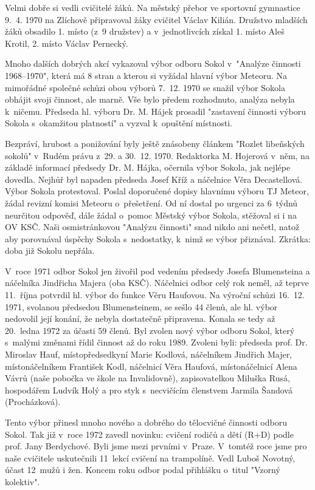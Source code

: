 \documentclass[a5paper, 11pt, twoside]{article}
\begin{document}
Velmi dobře si vedli cvičitelé žáků. Na městský přebor ve sportovní
gymnastice 9.~4. 1970 na Zlíchově připravoval žáky cvičitel Václav
Kilián. Družstvo mladších žáků obsadilo 1. místo (z~9 družstev) a
v~jednotlivcích získal 1. místo Aleš Krotil, 2. místo Václav Pernecký.

Mnoho dalších dobrých akcí vykazoval výbor odboru Sokol v~"Analýze
činnosti 1968--1970", která má 8 stran a kterou si vyžádal hlavní výbor
Meteoru. Na mimořádné společné schůzi obou výborů 7.~12. 1970 se snažil
výbor Sokola obhájit svoji činnost, ale marně. Vše bylo předem
rozhodnuto, analýza nebyla k~ničemu. Předseda hl. výboru Dr. M. Hájek
prosadil "zastavení činnosti výboru Sokola s~okamžitou platností" a
vyzval k~opuštění místnosti.

Bezpráví, hrubost a ponižování byly ještě znásobeny článkem "Rozlet
libeňských sokolů" v~Rudém právu z~29. a 30.~12. 1970. Redaktorka M.
Hojerová v~něm, na základě informací předsedy Dr. M. Hájka, očernila
výbor Sokola, jak nejlépe dovedla. Nejhůř byl napaden předseda Josef
Kříž a náčelnice Věra Decastellová. Výbor Sokola protestoval. Poslal
doporučené dopisy hlavnímu výboru TJ Meteor, žádal revizní komisi
Meteoru o~přešetření. Od ní dostal po urgenci za 6~týdnů neurčitou
odpověď, dále žádal o~pomoc Městský výbor Sokola, stěžoval si i na OV
KSČ. Naši osmistránkovou "Analýzu činnosti" snad nikdo ani nečetl,
natož aby porovnával úspěchy Sokola s~nedostatky, k~nimž se výbor
přiznával. Zkrátka: doba již Sokolu nepřála.

V~roce 1971 odbor Sokol jen živořil pod vedením předsedy Josefa
Blumensteina a náčelníka Jindřicha Majera (oba KSČ). Náčelnici odbor
celý rok neměl, až teprve 11.~října potvrdil hl. výbor do funkce Věru
Haufovou. Na výroční schůzi 16.~12. 1971, svolanou předsedou
Blumensteinem, se sešlo 44 členů, ale hl. výbor nedovolil její konání,
že nebyla dostatečně připravena. Konala se tedy až 20.~ledna 1972 za
účasti 59 členů. Byl zvolen nový výbor odboru Sokol, který s~malými
změnami řídil činnost až do roku 1989. Zvoleni byli: předseda prof. Dr.
Miroslav Hauf, místopředsedkyní Marie Kodlová, náčelníkem Jindřich
Majer, místonáčelníkem František Kodl, náčelnicí Věra Haufová,
místonáčelnicí Alena Vávrů (naše pobočka ve škole na Invalidovně),
zapisovatelkou Miluška Rusá, hospodářem Ludvík Holý a pro styk
s~necvičícím členstvem Jarmila Šandová (Procházková).

Tento výbor přinesl mnoho nového a dobrého do tělocvičné činnosti odboru
Sokol. Tak již v~roce 1972 zavedl novinku: cvičení rodičů a dětí (R+D)
podle prof. Jany Berdychové. Byli jsme mezi prvními v~Praze. V~tomtéž
roce jsme pro naše cvičitele uskutečnili 11~lekcí cvičení na trampolíně.
Vedl Luboš Novotný, účast 12~mužů i žen. Koncem roku odbor podal
přihlášku o~titul "Vzorný kolektiv".
\end{document}
